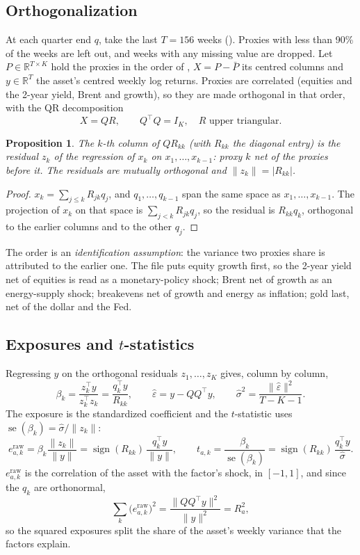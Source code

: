 \documentclass[11pt,a4paper]{article}
\newcommand{\code}[1]{\texttt{\detokenize{#1}}}
\newcommand{\R}{\mathbb{R}}
\DeclareMathOperator{\sign}{sign}
\newtheorem{proposition}{Proposition}
\begin{document}
\subsection{Orthogonalization}
At each quarter end $q$, take the last $T=156$ weeks (\code{window_weeks}). Proxies with less than 90\% of the weeks
are left out, and weeks with any missing value are dropped. Let $P\in\R^{T\times K}$ hold the proxies in the order of
\code{factors.json}, $X = P - \bar P$ its centred columns and $y\in\R^T$ the asset's centred weekly log returns.
Proxies are correlated (equities and the 2-year yield, Brent and growth), so they are made orthogonal in that order,
with the QR decomposition
\[
  X = QR, \qquad Q^\top Q = I_K, \quad R \text{ upper triangular}.
\]
\begin{proposition}
The $k$-th column of $Q R_{kk}$ (with $R_{kk}$ the diagonal entry) is the residual $z_k$ of the regression of $x_k$ on
$x_1,\dots,x_{k-1}$: proxy $k$ net of the proxies before it. The residuals are mutually orthogonal and
$\|z_k\| = |R_{kk}|$.
\end{proposition}
\begin{proof}
$x_k = \sum_{j\le k} R_{jk} q_j$, and $q_1,\dots,q_{k-1}$ span the same space as $x_1,\dots,x_{k-1}$. The projection of
$x_k$ on that space is $\sum_{j<k}R_{jk}q_j$, so the residual is $R_{kk}q_k$, orthogonal to the earlier columns and to
the other $q_j$.
\end{proof}
The order is an \emph{identification assumption}: the variance two proxies share is attributed to the earlier one.
The file puts equity growth first, so the 2-year yield net of equities is read as a monetary-policy shock; Brent net
of growth as an energy-supply shock; breakevens net of growth and energy as inflation; gold last, net of the dollar
and the Fed.

\subsection{Exposures and \texorpdfstring{$t$}{t}-statistics}
Regressing $y$ on the orthogonal residuals $z_1,\dots,z_K$ gives, column by column,
\[
  \beta_k = \frac{z_k^\top y}{z_k^\top z_k} = \frac{q_k^\top y}{R_{kk}},
  \qquad
  \hat\varepsilon = y - Q Q^\top y, \qquad \hat\sigma^2 = \frac{\|\hat\varepsilon\|^2}{T-K-1}.
\]
The exposure is the standardized coefficient and the $t$-statistic uses $\operatorname{se}(\beta_k)=\hat\sigma/\|z_k\|$:
\[
  \boxed{\;e^{\text{raw}}_{a,k} = \beta_k\frac{\|z_k\|}{\|y\|} = \sign(R_{kk})\,\frac{q_k^\top y}{\|y\|},
  \qquad t_{a,k} = \frac{\beta_k}{\operatorname{se}(\beta_k)} = \sign(R_{kk})\,\frac{q_k^\top y}{\hat\sigma}.\;}
\]
$e^{\text{raw}}_{a,k}$ is the correlation of the asset with the factor's shock, in $[-1,1]$, and since the $q_k$ are
orthonormal,
\[
  \sum_k \big(e^{\text{raw}}_{a,k}\big)^2 = \frac{\|QQ^\top y\|^2}{\|y\|^2} = R^2_a ,
\]
so the squared exposures split the share of the asset's weekly variance that the factors explain.
\end{document}
